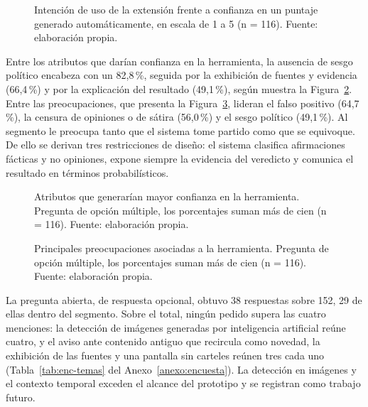 \begin{figure}[htbp]
  \centering
  
  \caption{Intención de uso de la extensión frente a confianza en un puntaje generado automáticamente, en escala de 1 a 5 (n = 116). Fuente: elaboración propia.}
  \label{fig:encuesta-intencion-confianza}
\end{figure}

Entre los atributos que darían confianza en la herramienta, la ausencia de sesgo político encabeza con un 82,8\,\%, seguida por la exhibición de fuentes y evidencia (66,4\,\%) y por la explicación del resultado (49,1\,\%), según muestra la Figura~\ref{fig:encuesta-drivers}. Entre las preocupaciones, que presenta la Figura~\ref{fig:encuesta-preocupaciones}, lideran el falso positivo (64,7\,\%), la censura de opiniones o de sátira (56,0\,\%) y el sesgo político (49,1\,\%). Al segmento le preocupa tanto que el sistema tome partido como que se equivoque. De ello se derivan tres restricciones de diseño: el sistema clasifica afirmaciones fácticas y no opiniones, expone siempre la evidencia del veredicto y comunica el resultado en términos probabilísticos.

\begin{figure}[htbp]
  \centering
  
  \caption{Atributos que generarían mayor confianza en la herramienta. Pregunta de opción múltiple, los porcentajes suman más de cien (n = 116). Fuente: elaboración propia.}
  \label{fig:encuesta-drivers}
\end{figure}

\begin{figure}[htbp]
  \centering
  
  \caption{Principales preocupaciones asociadas a la herramienta. Pregunta de opción múltiple, los porcentajes suman más de cien (n = 116). Fuente: elaboración propia.}
  \label{fig:encuesta-preocupaciones}
\end{figure}

La pregunta abierta, de respuesta opcional, obtuvo 38 respuestas sobre 152, 29 de ellas dentro del segmento. Sobre el total, ningún pedido supera las cuatro menciones: la detección de imágenes generadas por inteligencia artificial reúne cuatro, y el aviso ante contenido antiguo que recircula como novedad, la exhibición de las fuentes y una pantalla sin carteles reúnen tres cada uno (Tabla~\ref{tab:enc-temas} del Anexo~\ref{anexo:encuesta}). La detección en imágenes y el contexto temporal exceden el alcance del prototipo y se registran como trabajo futuro.

